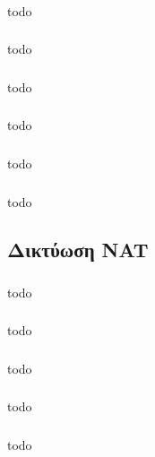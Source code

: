 \documentclass[a4paper, 12pt]{article}
\begin{document}
		\subsubsection{}
			todo

		\subsubsection{}
			todo

		\subsubsection{}
			todo

		\subsubsection{}
			todo

		\subsubsection{}
			todo

		\subsubsection{}
			todo

	\subsection{Δικτύωση NAT}

		\subsubsection{}
			todo

		\subsubsection{}
			todo

		\subsubsection{}
			todo

		\subsubsection{}
			todo

		\subsubsection{}
			todo
\end{document}
